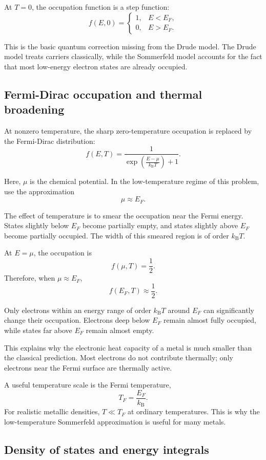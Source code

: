 At \(T=0\), the occupation function is a step function:
\[
f(E,0)=
\begin{cases}
1, & E<E_F,\\
0, & E>E_F.
\end{cases}
\]

This is the basic quantum correction missing from the Drude model. The Drude model treats carriers classically, while the Sommerfeld model accounts for the fact that most low-energy electron states are already occupied.

\subsection{Fermi-Dirac occupation and thermal broadening}

At nonzero temperature, the sharp zero-temperature occupation is replaced by the Fermi-Dirac distribution:
\[
f(E,T)
=
\frac{1}{
\exp\left(\frac{E-\mu}{k_{\mathrm B}T}\right)+1
}.
\]

Here, \(\mu\) is the chemical potential. In the low-temperature regime of this problem, use the approximation
\[
\mu\approx E_F.
\]

The effect of temperature is to smear the occupation near the Fermi energy. States slightly below \(E_F\) become partially empty, and states slightly above \(E_F\) become partially occupied. The width of this smeared region is of order \(k_{\mathrm B}T\).

At \(E=\mu\), the occupation is
\[
f(\mu,T)=\frac12.
\]
Therefore, when \(\mu\approx E_F\),
\[
f(E_F,T)\approx\frac12.
\]

Only electrons within an energy range of order \(k_{\mathrm B}T\) around \(E_F\) can significantly change their occupation. Electrons deep below \(E_F\) remain almost fully occupied, while states far above \(E_F\) remain almost empty.

This explains why the electronic heat capacity of a metal is much smaller than the classical prediction. Most electrons do not contribute thermally; only electrons near the Fermi surface are thermally active.

A useful temperature scale is the Fermi temperature,
\[
T_F=\frac{E_F}{k_{\mathrm B}}.
\]
For realistic metallic densities, \(T\ll T_F\) at ordinary temperatures. This is why the low-temperature Sommerfeld approximation is useful for many metals.

\subsection{Density of states and energy integrals}


